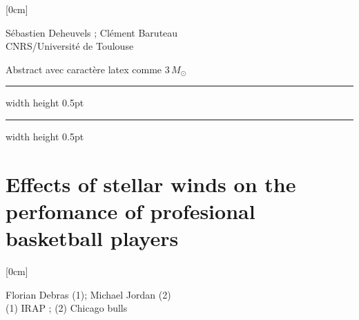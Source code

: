 \documentclass[a4paper,11pt]{book}
\def\doubleline{
\hrule width \hsize height 0.5pt  \kern 1mm \hrule width \hsize height 0.5pt 
}
\begin{document}
[0cm]



\begin{center}
    
{\large Sébastien Deheuvels };{ \large  Clément Baruteau}\\
  
\vspace{2 mm}
\noindent CNRS/Université de Toulouse\\

\end{center}



  
\vspace{2 mm}
\noindent Abstract avec caractère latex comme $3\,M_{\odot}$

\noindent\doubleline
        
          \section[Effects of stellar winds on the perfomance of profesional basketball players \newline(Florian Debras)] { Effects of stellar winds on the perfomance of profesional basketball players }



[0cm]



\begin{center}
    
{\large Florian Debras  (1)};{ \large  Michael Jordan (2)}\\
  
\vspace{2 mm}
\noindent (1) IRAP ; (2)  Chicago bulls\\

\end{center}
\end{document}
